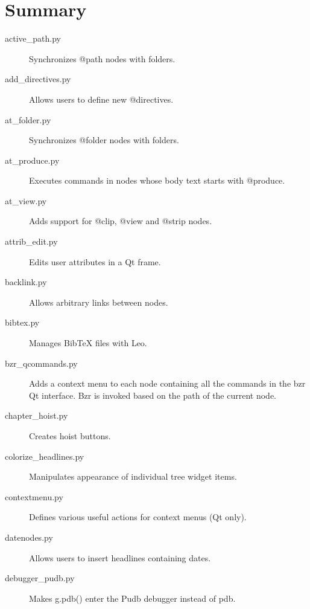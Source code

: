 \documentclass[a4paper,10pt,english]{sphinxmanual}
\begin{document}
\section{Summary}
\label{plugins:summary}\begin{description}
\item[{active\_path.py}] \leavevmode
Synchronizes @path nodes with folders.

\item[{add\_directives.py}] \leavevmode
Allows users to define new @directives.

\item[{at\_folder.py}] \leavevmode
Synchronizes @folder nodes with folders.

\item[{at\_produce.py}] \leavevmode
Executes commands in nodes whose body text starts with @produce.

\item[{at\_view.py}] \leavevmode
Adds support for @clip, @view and @strip nodes.

\item[{attrib\_edit.py}] \leavevmode
Edits user attributes in a Qt frame.

\item[{backlink.py}] \leavevmode
Allows arbitrary links between nodes.

\item[{bibtex.py}] \leavevmode
Manages BibTeX files with Leo.

\item[{bzr\_qcommands.py}] \leavevmode
Adds a context menu to each node containing all the commands in the bzr Qt
interface. Bzr is invoked based on the path of the current node.

\item[{chapter\_hoist.py}] \leavevmode
Creates hoist buttons.

\item[{colorize\_headlines.py}] \leavevmode
Manipulates appearance of individual tree widget items.

\item[{contextmenu.py}] \leavevmode
Defines various useful actions for context menus (Qt only).

\item[{datenodes.py}] \leavevmode
Allows users to insert headlines containing dates.

\item[{debugger\_pudb.py}] \leavevmode
Makes g.pdb() enter the Pudb debugger instead of pdb.


\end{description}
\end{document}
